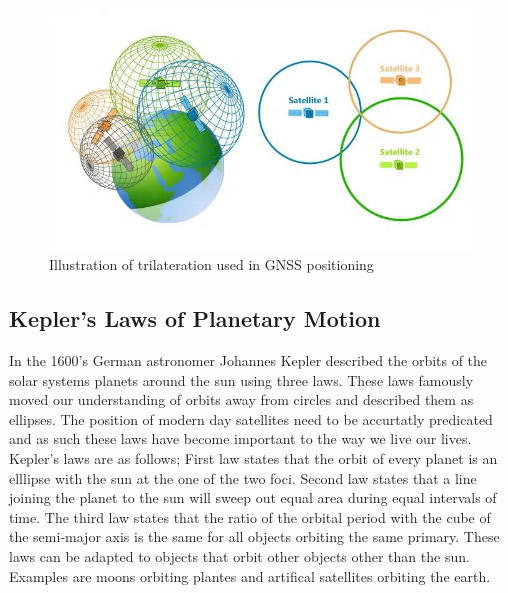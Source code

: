 \begin{figure}[h]
    \begin{centering}
        \includegraphics[width=14cm,keepaspectratio]{Figures/trilateration.png}
        \caption{Illustration of trilateration used in GNSS positioning}
        \label{fig:trilateration}
    \end{centering}
\end{figure}

\subsection{Kepler's Laws of Planetary Motion} \label{subsec: OrbitalMechanics}
In the 1600's German astronomer Johannes Kepler described the orbits of the solar systems planets around the sun using three laws. 
These laws famously moved our understanding of orbits away from circles and described them as ellipses. The position of modern day satellites need to be accurtatly
predicated and as such these laws have become important to the way we live our lives. Kepler's laws are as follows; First law states that the orbit of every planet is an
elllipse with the sun at the one of the two foci. Second law states that a line joining the planet to the sun will sweep out equal area during equal intervals of time.
The third law states that the ratio of the orbital period with the cube of the semi-major axis is the same for all objects orbiting the same primary. These laws can be
adapted to objects that orbit other objects other than the sun. Examples are moons orbiting plantes and artifical satellites orbiting the earth.


